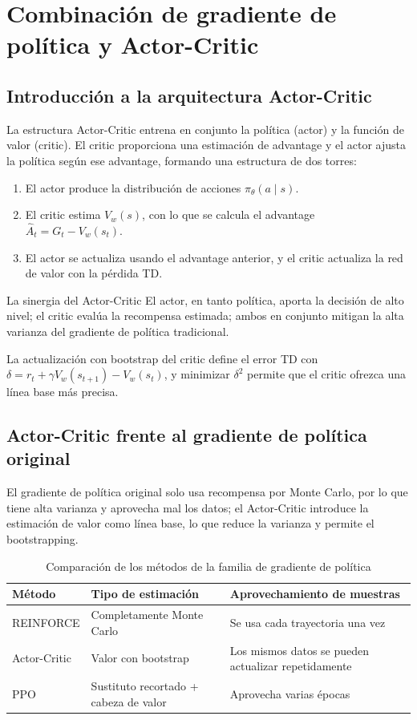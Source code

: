 \section{Combinación de gradiente de política y Actor-Critic}
\subsection{Introducción a la arquitectura Actor-Critic}
La estructura Actor-Critic entrena en conjunto la política (actor) y la función de valor (critic). El critic proporciona una estimación de advantage y el actor ajusta la política según ese advantage, formando una estructura de dos torres:
\begin{enumerate}
    \item El actor produce la distribución de acciones $\pi_\theta(a\mid s)$.
    \item El critic estima $V_w(s)$, con lo que se calcula el advantage $\hat{A}_t = G_t - V_w(s_t)$.
    \item El actor se actualiza usando el advantage anterior, y el critic actualiza la red de valor con la pérdida TD.
\end{enumerate}
\begin{knowledgebox}{La sinergia del Actor-Critic}
El actor, en tanto política, aporta la decisión de alto nivel; el critic evalúa la recompensa estimada; ambos en conjunto mitigan la alta varianza del gradiente de política tradicional.
\end{knowledgebox}

La actualización con bootstrap del critic define el error TD con $\delta = r_t + \gamma V_w(s_{t+1}) - V_w(s_t)$, y minimizar $\delta^2$ permite que el critic ofrezca una línea base más precisa.

\subsection{Actor-Critic frente al gradiente de política original}
El gradiente de política original solo usa recompensa por Monte Carlo, por lo que tiene alta varianza y aprovecha mal los datos; el Actor-Critic introduce la estimación de valor como línea base, lo que reduce la varianza y permite el bootstrapping.
\begin{table}[H]
\centering
\small
\begin{tabular}{p{}p{}p{}}
\toprule
Método & Tipo de estimación & Aprovechamiento de muestras \\
\midrule
REINFORCE & Completamente Monte Carlo & Se usa cada trayectoria una vez \\
Actor-Critic & Valor con bootstrap & Los mismos datos se pueden actualizar repetidamente \\
PPO & Sustituto recortado + cabeza de valor & Aprovecha varias épocas \\
\bottomrule
\end{tabular}
\caption{Comparación de los métodos de la familia de gradiente de política}
\end{table}

